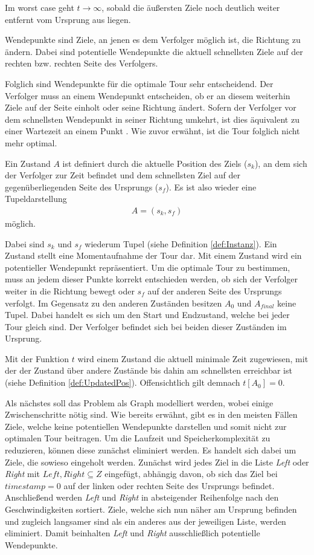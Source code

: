 \documentclass[german,version-2019-11]{uzl-thesis}
\begin{document}
Im worst case geht $t\rightarrow\infty$, sobald die äußersten Ziele noch deutlich weiter entfernt vom Ursprung aus liegen. 
\begin{definition}
Wendepunkte sind Ziele, an jenen es dem Verfolger möglich ist, die Richtung zu ändern. Dabei sind potentielle Wendepunkte die aktuell  schnellsten Ziele auf der rechten bzw. rechten Seite des Verfolgers.
\end{definition}\noindent
Folglich sind Wendepunkte für die optimale Tour sehr entscheidend. Der Verfolger muss an einem Wendepunkt entscheiden, ob er an diesem weiterhin Ziele auf der Seite einholt oder seine Richtung ändert. Sofern der Verfolger vor dem schnellsten Wendepunkt in seiner Richtung umkehrt, ist dies äquivalent zu einer Wartezeit an einem Punkt \cite{helvig}. Wie zuvor erwähnt, ist die Tour folglich nicht mehr optimal. 
\begin{definition}
Ein Zustand $A$ ist definiert durch die aktuelle Position des Ziels ($s_k$), an dem sich der Verfolger zur Zeit befindet und dem schnellsten Ziel auf der gegenüberliegenden Seite des Ursprungs ($s_f$). Es ist also wieder eine Tupeldarstellung
\begin{align*}
A = (s_k, s_f)
\end{align*}
möglich.
\end{definition}\noindent
Dabei sind $s_k$ und $s_f$ wiederum Tupel (siehe Definition \ref{def:Instanz}). Ein Zustand stellt eine Momentaufnahme der Tour dar. Mit einem Zustand wird ein potentieller Wendepunkt repräsentiert. Um die optimale Tour zu bestimmen, muss an jedem dieser Punkte korrekt entschieden werden, ob sich der Verfolger weiter in die Richtung bewegt oder $s_f$ auf der anderen Seite des Ursprungs verfolgt. Im Gegensatz zu den anderen Zuständen besitzen $A_0$ und $A_{final}$ keine Tupel. Dabei handelt es sich um den Start und Endzustand, welche bei jeder Tour gleich sind. Der Verfolger befindet sich bei beiden dieser Zuständen im Ursprung. 

Mit der Funktion $t$ wird einem Zustand die aktuell minimale Zeit zugewiesen, mit der der Zustand über andere Zustände bis dahin am schnellsten erreichbar ist (siehe Definition \ref{def:UpdatedPos}). Offensichtlich gilt demnach $t[A_0] = 0$.

Als nächstes soll das Problem als Graph modelliert werden, wobei einige Zwischenschritte nötig sind. Wie bereits erwähnt, gibt es in den meisten Fällen Ziele, welche keine potentiellen Wendepunkte darstellen und somit nicht zur optimalen Tour beitragen. Um die Laufzeit und Speicherkomplexität zu reduzieren, können diese zunächst eliminiert werden. Es handelt sich dabei um Ziele, die sowieso eingeholt werden. Zunächst wird jedes Ziel in die Liste \emph{Left} oder \emph{Right} mit $Left, Right \subseteq Z$ eingefügt, abhängig davon, ob sich das Ziel bei $timestamp = 0$ auf der linken oder rechten Seite des Ursprungs befindet. Anschließend werden \emph{Left} und \emph{Right} in absteigender Reihenfolge nach den Geschwindigkeiten sortiert. Ziele, welche sich nun näher am Ursprung befinden und zugleich langsamer sind als ein anderes aus der jeweiligen Liste, werden eliminiert. Damit beinhalten \emph{Left} und \emph{Right} ausschließlich potentielle Wendepunkte. 
\end{document}
